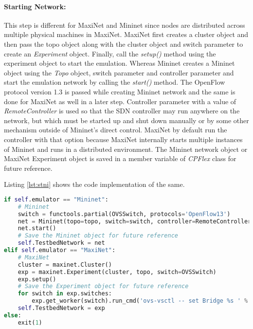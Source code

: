 \paragraph{Starting Network:}
This step is different for MaxiNet and Mininet since nodes are distributed across multiple physical machines in MaxiNet. MaxiNet first creates a cluster object and then pass the topo object along with the cluster object and switch parameter to create an \textit{Experiment} object. Finally, call the \textit{setup()} method using the experiment object to start the emulation. Whereas Mininet creates a Mininet object using the \textit{Topo} object, switch parameter and controller parameter and start the emulation network by calling the \textit{start()} method. The OpenFlow protocol version 1.3 is passed while creating Mininet network and the same is done for MaxiNet as well in a later step. Controller parameter with a value of \textit{RemoteController} is used so that the SDN controller may run anywhere on the network, but which must be started up and shut down manually or by some other mechanism outside of Mininet's direct control. MaxiNet by default run the controller with that option because MaxiNet internally starts multiple instances of Mininet and runs in a distributed environment. The Mininet network object or MaxiNet Experiment object is saved in a member variable of \textit{CPFlex} class for future reference. 

Listing \ref{lst:stni} shows the code implementation of the same.
 
\begin{lstlisting}[caption={Starting network implementation},label={lst:stni},language=Python,tabsize=2,basicstyle=\footnotesize,breaklines=true, showspaces=false,showstringspaces=false,showtabs=false,frame=single]
if self.emulator == "Mininet":
	# Mininet
	switch = functools.partial(OVSSwitch, protocols='OpenFlow13')
	net = Mininet(topo=topo, switch=switch, controller=RemoteController, host=CPULimitedHost, link=TCLink)
	net.start()
	# Save the Mininet object for future reference
	self.TestbedNetwork = net
elif self.emulator == "MaxiNet":
	# MaxiNet
	cluster = maxinet.Cluster()
	exp = maxinet.Experiment(cluster, topo, switch=OVSSwitch)
	exp.setup()
	# Save the Experiment object for future reference
	for switch in exp.switches:
		exp.get_worker(switch).run_cmd('ovs-vsctl -- set Bridge %s ' % switch.name + 'protocols=OpenFlow10,OpenFlow12,OpenFlow13')
	self.TestbedNetwork = exp
else:
	exit(1)
\end{lstlisting}

